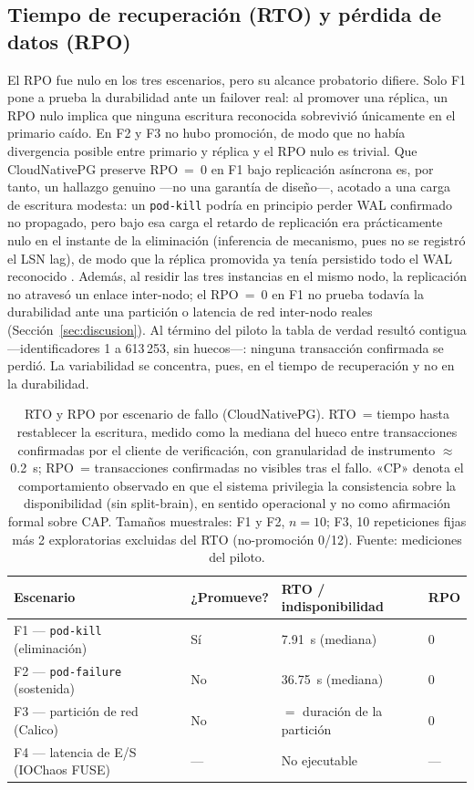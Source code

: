 \documentclass[a4paper]{llncs}
\begin{document}
\subsection{Tiempo de recuperación (RTO) y pérdida de datos (RPO)}

El RPO fue nulo en los tres escenarios, pero su alcance probatorio difiere. Solo
F1 pone a prueba la durabilidad ante un failover real: al promover una réplica,
un RPO nulo implica que ninguna escritura reconocida sobrevivió únicamente en el
primario caído. En F2 y F3 no hubo promoción, de modo que no había divergencia
posible entre primario y réplica y el RPO nulo es trivial. Que CloudNativePG
preserve RPO~=~0 en F1 bajo replicación asíncrona es, por tanto, un hallazgo
genuino ---no una garantía de diseño---, acotado a una carga de escritura modesta:
un \texttt{pod-kill} podría en principio perder WAL confirmado no propagado, pero
bajo esa carga el retardo de replicación era prácticamente nulo en el instante de
la eliminación (inferencia de mecanismo, pues no se registró el LSN lag), de modo
que la réplica promovida ya tenía persistido todo el WAL reconocido
\cite{cnpgdocs}. Además, al residir las tres instancias en el mismo nodo, la
replicación no atravesó un enlace inter-nodo; el RPO~=~0 en F1 no prueba todavía
la durabilidad ante una partición o latencia de red inter-nodo reales
(Sección~\ref{sec:discusion}). Al término del piloto la tabla de verdad resultó
contigua ---identificadores 1 a 613\,253, sin huecos---: ninguna transacción
confirmada se perdió. La variabilidad se concentra, pues, en el tiempo de
recuperación y no en la durabilidad.

\begin{table}[tb]
\centering
\caption{RTO y RPO por escenario de fallo (CloudNativePG). RTO~= tiempo hasta
restablecer la escritura, medido como la mediana del hueco entre transacciones
confirmadas por el cliente de verificación, con granularidad de instrumento
$\approx$0.2~s; RPO~= transacciones confirmadas no visibles tras el fallo. «CP»
denota el comportamiento observado en que el sistema privilegia la consistencia
sobre la disponibilidad (sin split-brain), en sentido operacional y no como
afirmación formal sobre CAP. Tamaños muestrales: F1 y F2, $n=10$; F3, 10
repeticiones fijas más 2 exploratorias excluidas del RTO (no-promoción 0/12).
Fuente: mediciones del piloto.}
\label{tab:resultados}
\begin{tabular}{@{}llll@{}}
\toprule
Escenario & ¿Promueve? & RTO / indisponibilidad & RPO \\
\midrule
F1 --- \texttt{pod-kill} (eliminación) & Sí & 7.91~s (mediana) & 0 \\
F2 --- \texttt{pod-failure} (sostenida) & No & 36.75~s (mediana) & 0 \\
F3 --- partición de red (Calico) & No & $=$ duración de la partición & 0 \\
F4 --- latencia de E/S (IOChaos FUSE) & --- & No ejecutable & --- \\
\bottomrule
\end{tabular}
\end{table}
\end{document}
